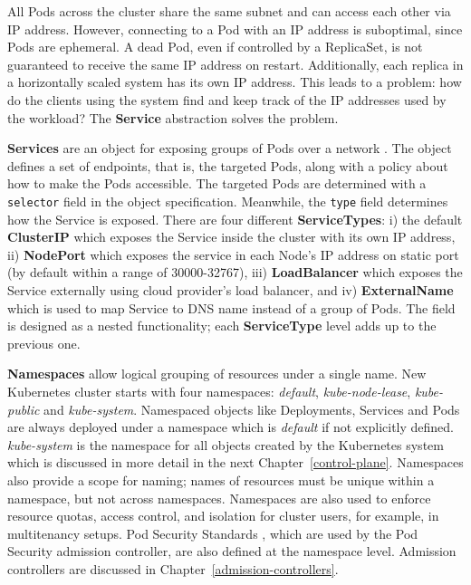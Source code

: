 \documentclass[english, 12pt, a4paper, sci, utf8, a-2b, online]{aaltothesis}
\newcommand{\mycomment}[3]{\textcolor{#1}{#2:~#3}}
\newcommand{\jb}[1]{\noindent\mycomment{aaltoRed}{JB}{#1}}
\begin{document}
All Pods across the cluster share the same subnet and can access each other via IP address.
However, connecting to a Pod with an IP address is suboptimal, since Pods are ephemeral.
A dead Pod, even if controlled by a ReplicaSet, is not guaranteed to receive the same IP address on restart.
Additionally, each replica in a horizontally scaled system has its own IP address.
This leads to a problem: how do the clients using the system find and keep track of the IP addresses used by the workload? The \textbf{Service} abstraction solves the problem.

\textbf{Services} are an object for exposing groups of Pods over a network \cite{k8s-docs-services}.
The object defines a set of endpoints, that is, the targeted Pods, along with a policy about how to make the Pods accessible.
The targeted Pods are determined with a \lstinline{selector} field in the object specification.
Meanwhile, the \lstinline{type} field determines how the Service is exposed.
There are four different \textbf{ServiceTypes}: i) the default \textbf{ClusterIP} which exposes the Service inside the cluster with its own IP address, ii) \textbf{NodePort} which exposes the service in each Node's IP address on static port (by default within a range of 30000-32767), iii) \textbf{LoadBalancer} which exposes the Service externally using cloud provider's load balancer, and iv) \textbf{ExternalName} which is used to map Service to DNS name instead of a group of Pods.
The field is designed as a nested functionality; each \textbf{ServiceType} level adds up to the previous one.


\textbf{Namespaces} allow logical grouping of resources under a single name.
New Kubernetes cluster starts with four namespaces: \emph{default}, \emph{kube-node-lease}, \emph{kube-public} and \emph{kube-system}.
Namespaced objects like Deployments, Services and Pods are always deployed under a namespace which is \emph{default} if not explicitly defined.
\emph{kube-system} is the namespace for all objects created by the Kubernetes system which is discussed in more detail in the next Chapter~\ref{control-plane}.
Namespaces also provide a scope for naming; names of resources must be unique within a namespace, but not across namespaces.
Namespaces are also used to enforce resource quotas, access control, and isolation for cluster users, for example, in multitenancy setups.
Pod Security Standards \cite{k8s-docs-pss}, which are used by the Pod Security admission controller, are also defined at the namespace level.
Admission controllers are discussed in Chapter~\ref{admission-controllers}.
\end{document}
